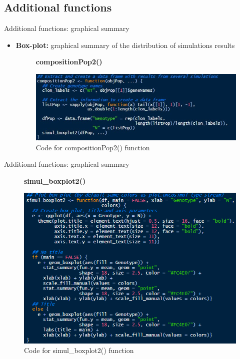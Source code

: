 \subsection{Additional functions}

\begin{frame}{Additional functions: graphical summary}
    \begin{itemize}
        \item \textbf{Box-plot:} graphical summary of the distribution of simulations results
        \textbf{}
        \begin{figure}[t]
            \centering
            \textbf{compositionPop2()}\par\medskip
            \includegraphics[scale=0.6]{img/compositionPop2.PNG}
            \caption{Code for compositionPop2() function}
        \end{figure}
    \end{itemize}
\end{frame}
\begin{frame}{Additional functions: graphical summary}
        \begin{figure}[t]
            \centering
            \textbf{simul\_boxplot2()}\par\medskip
            \includegraphics[scale=0.5]{img/simul_boxplot.PNG}
            \caption{Code for simul\_boxplot2() function}
        \end{figure}
\end{frame}
